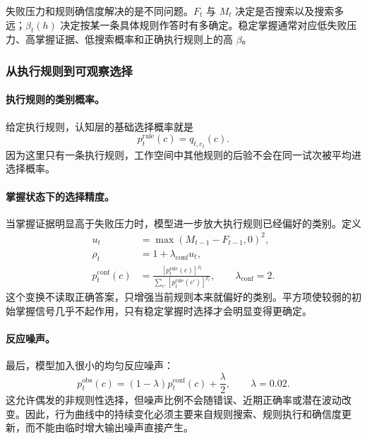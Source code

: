 失败压力和规则确信度解决的是不同问题。$F_t$ 与 $M_t$ 决定是否搜索以及搜索多远；$\beta_t(h)$ 决定按某一条具体规则作答时有多确定。稳定掌握通常对应低失败压力、高掌握证据、低搜索概率和正确执行规则上的高 $\beta$。


\subsubsection{从执行规则到可观察选择}

\paragraph{执行规则的类别概率。}
给定执行规则，认知层的基础选择概率就是
\begin{equation}
p_t^{\mathrm{rule}}(c)=q_{t,e_t}(c).
\label{eq:dynamic-executed-choice}
\end{equation}
因为这里只有一条执行规则，工作空间中其他规则的后验不会在同一试次被平均进选择概率。

\paragraph{掌握状态下的选择精度。}
当掌握证据明显高于失败压力时，模型进一步放大执行规则已经偏好的类别。定义
\begin{align}
u_t&=\max(M_{t-1}-F_{t-1},0)^2,
\nonumber\\
\rho_t&=1+\lambda_{\mathrm{conf}}u_t,
\nonumber\\
p_t^{\mathrm{conf}}(c)
&=
\frac{[p_t^{\mathrm{rule}}(c)]^{\rho_t}}
{\sum_{c'}[p_t^{\mathrm{rule}}(c')]^{\rho_t}},
\qquad \lambda_{\mathrm{conf}}=2.
\label{eq:dynamic-strategy-confidence}
\end{align}
这个变换不读取正确答案，只增强当前规则本来就偏好的类别。平方项使较弱的初始掌握信号几乎不起作用，只有稳定掌握时选择才会明显变得更确定。

\paragraph{反应噪声。}
最后，模型加入很小的均匀反应噪声：
\begin{equation}
p_t^{\mathrm{obs}}(c)
=(1-\lambda)p_t^{\mathrm{conf}}(c)+\frac{\lambda}{2},
\qquad \lambda=0.02.
\label{eq:dynamic-output-lapse}
\end{equation}
这允许偶发的非规则性选择，但噪声比例不会随错误、近期正确率或潜在波动改变。因此，行为曲线中的持续变化必须主要来自规则搜索、规则执行和确信度更新，而不能由临时增大输出噪声直接产生。


